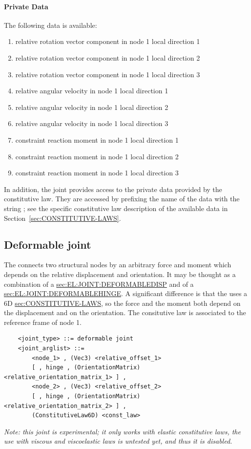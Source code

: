 \paragraph{Private Data}
The following data is available:
\begin{enumerate}
\item {} relative rotation vector component in node 1 local direction 1
\item {} relative rotation vector component in node 1 local direction 2
\item {} relative rotation vector component in node 1 local direction 3
\item {} relative angular velocity in node 1 local direction 1
\item {} relative angular velocity in node 1 local direction 2
\item {} relative angular velocity in node 1 local direction 3
\item {} constraint reaction moment in node 1 local direction 1
\item {} constraint reaction moment in node 1 local direction 2
\item {} constraint reaction moment in node 1 local direction 3
\end{enumerate}
In addition, the joint provides
access to the private data provided by the constitutive law.
They are accessed by prefixing the name of the data with the string
; see the specific constitutive law
description of the available data in Section~\ref{sec:CONSTITUTIVE-LAWS}.




\subsection{Deformable joint}
The  connects two structural nodes by an arbitrary
force and moment which depends on the relative displacement and orientation.
It may be thought as a combination of a
\hyperref{\kw{deformable displacement joint}}{\kw{deformable displacement joint} (see Section~}{)}{sec:EL:JOINT:DEFORMABLEDISP}
and of a 
\hyperref{\kw{deformable hinge}}{\kw{deformable hinge} (see Section~}{)}{sec:EL:JOINT:DEFORMABLEHINGE}.
A significant difference is that the  uses a 6D
\hyperref{\kw{constitutive law}}{\kw{constitutive law} (see Section~}{)}{sec:CONSTITUTIVE-LAWS},
so the force and the moment both depend on the displacement
and on the orientation.
The consitutive law is associated to the reference frame of node 1.
\begin{verbatim}
    <joint_type> ::= deformable joint
    <joint_arglist> ::= 
        <node_1> , (Vec3) <relative_offset_1>
        [ , hinge , (OrientationMatrix) <relative_orientation_matrix_1> ] ,
        <node_2> , (Vec3) <relative_offset_2>
        [ , hinge , (OrientationMatrix) <relative_orientation_matrix_2> ] ,
        (ConstitutiveLaw6D) <const_law>
\end{verbatim}
\emph{Note: this joint is experimental; it only works with elastic 
constitutive laws, the use with viscous and viscoelastic laws 
is untested yet, and thus it is disabled.}

